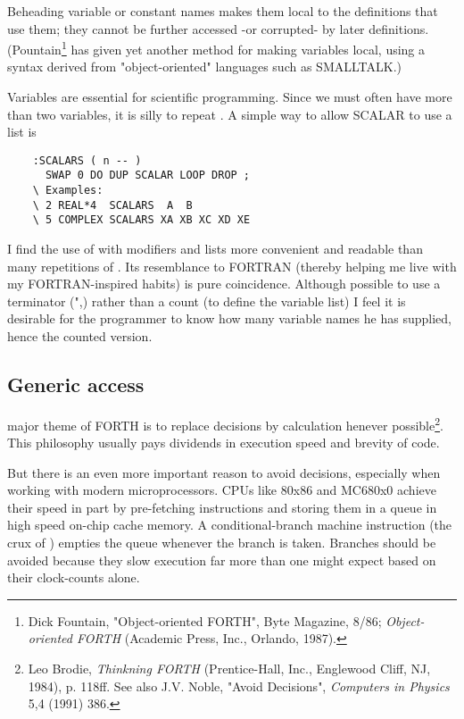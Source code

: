 Beheading variable or constant names makes them local to the definitions that use them; they cannot be further accessed -or corrupted- by later definitions. (Pountain\footnote{Dick Fountain, "Object-oriented FORTH", Byte Magazine, 8/86; \textit{Object-oriented FORTH} (Academic Press, Inc., Orlando, 1987).} has given yet another method for making variables local, using a syntax derived from "object-oriented" languages such as SMALLTALK.)

Variables are essential for scientific programming. Since we must often have more than two variables, it is silly to repeat . A simple way to allow SCALAR to use a list is

\begin{lstlisting}
    :SCALARS ( n -- )
      SWAP 0 DO DUP SCALAR LOOP DROP ;
    \ Examples:
    \ 2 REAL*4  SCALARS  A  B
    \ 5 COMPLEX SCALARS XA XB XC XD XE
\end{lstlisting}

I find the use of  with modifiers and lists more convenient and readable than many repetitions of . Its resemblance to FORTRAN (thereby helping me live with my FORTRAN-inspired habits) is pure coincidence. Although possible to use a terminator (",\eg) rather than a count (to define the variable list) I feel it is desirable for the programmer to know how many variable names he has supplied, hence the counted version.

\subsection{Generic access}
 major theme of FORTH is to replace decisions by calculation henever possible\footnote{Leo Brodie, \textit{Thinkning FORTH} (Prentice-Hall, Inc., Englewood Cliff, NJ, 1984), p. 118ff. See also J.V. Noble, "Avoid Decisions", \textit{Computers in Physics} 5,4 (1991) 386.}. This philosophy usually pays dividends in execution speed and brevity of code.

But there is an even more important reason to avoid  decisions, especially when working with modern microprocessors. CPUs like 80x86 and MC680x0 achieve their speed in part by pre-fetching instructions and storing them in a queue in high speed on-chip cache memory. A conditional-branch machine instruction (the crux of ) empties the queue whenever the branch is taken. Branches should be avoided because they slow execution far more than one might expect based on their clock-counts alone.

